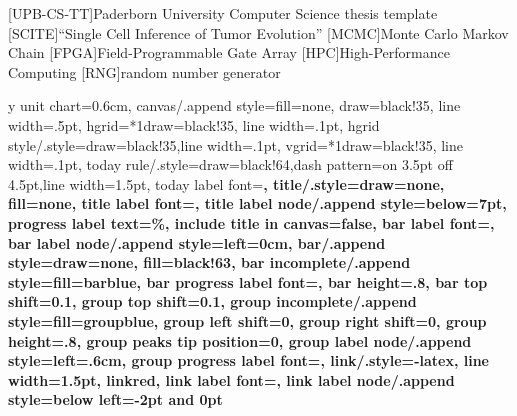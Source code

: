 
\usepackage{graphicx}
\usepackage{amsmath, amssymb, amsfonts}%
\usepackage{amsthm}%
\usepackage[colorinlistoftodos]{todonotes}%
\usepackage{subfig}%
\usepackage{url}%
\usepackage{longtable}%
\usepackage{booktabs}%
\usepackage[nolist]{acronym}%
\usepackage{pgfgantt} %


\renewcommand{\epsilon}{\varepsilon}
\DeclareMathOperator*{\argmax}{arg\,max}
\DeclareMathOperator*{\argmin}{arg\,min}

\newcommand*{\bfrac}[2]{\genfrac{\lbrace}{\rbrace}{0pt}{}{#1}{#2}} %

[UPB-CS-TT]{Paderborn University Computer Science thesis template}
[SCITE]{``Single Cell Inference of Tumor Evolution''}
[MCMC]{Monte Carlo Markov Chain}
[FPGA]{Field-Programmable Gate Array}
[HPC]{High-Performance Computing}
[RNG]{random number generator}

\DeclareMathOperator{\testop}{top}

\renewcommand\sfdefault{phv}
\renewcommand\mddefault{mc}
\renewcommand\bfdefault{bc}
\sffamily
\ganttset
{%
	y unit chart=0.6cm,
	canvas/.append style={fill=none, draw=black!35, line width=.5pt},
	hgrid={*1{draw=black!35, line width=.1pt}},
	hgrid style/.style={draw=black!35,line width=.1pt},
	vgrid={*1{draw=black!35, line width=.1pt}},
	today rule/.style={draw=black!64,dash pattern=on 3.5pt off 4.5pt,line width=1.5pt},
	today label font=\small\bfseries,
	title/.style={draw=none, fill=none},
	title label font=\bfseries\footnotesize,
	title label node/.append style={below=7pt},
	progress label text={\%},
	include title in canvas=false,
	bar label font=\mdseries\small\color{black!70},
	bar label node/.append style={left=0cm},
	bar/.append style={draw=none, fill=black!63},
	bar incomplete/.append style={fill=barblue},
	bar progress label font=\mdseries\footnotesize\color{black!70},
	bar height=.8,
	bar top shift=0.1,
	group top shift=0.1,
	group incomplete/.append style={fill=groupblue},
	group left shift=0,
	group right shift=0,
	group height=.8,
	group peaks tip position=0,
	group label node/.append style={left=.6cm},
	group progress label font=\bfseries\small,
	link/.style={-latex, line width=1.5pt, linkred},
	link label font=\scriptsize\bfseries,
	link label node/.append style={below left=-2pt and 0pt}
}